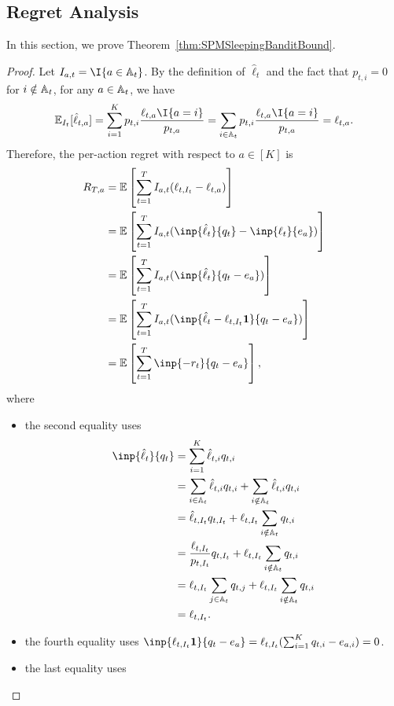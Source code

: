 \subsection{Regret Analysis}
In this section, we prove Theorem~\ref{thm:SPMSleepingBanditBound}.
\begin{proof}
Let $I_{a,t} = \I{a \in \sA_t}$. By the definition of $\hat{\ell}_t$ and the fact that $p_{t,i} = 0$ for $i \notin {\mathbb{A}}_t$, for any $a \in {\mathbb{A}}_t$, we have 
\begin{align}
    \E_{I_t}[\hat{\ell}_{t,a}] = \sum_{i=1}^K p_{t,i}\frac{\ell_{t,a}\I{a = i}}{p_{t,a}} = \sum_{i \in \sA_t}p_{t,i} \frac{\ell_{t,a}\I{a = i}}{p_{t,a}} = \ell_{t,a}.
\end{align}
Therefore, the per-action regret with respect to $a \in [K]$ is
\begin{align*}
    R_{T,a} &= \E\left[\sum_{t=1}^T I_{a,t}(\ell_{t,I_t} - \ell_{t,a})\right] \\
    &= \E\left[ \sum_{t=1}^T I_{a,t}(\inp{\hat{\ell}_t}{q_t} - \inp{\ell_t}{e_a}) \right] \\
    &= \E\left[ \sum_{t=1}^T I_{a,t}(\inp{\hat{\ell}_t}{q_t-e_a}) \right] \\
    &= \E\left[ \sum_{t=1}^T I_{a,t}(\inp{\hat{\ell}_t - \ell_{t,I_t}\1}{q_t-e_a}) \right] \\
    &= \E\left[ \sum_{t=1}^T \inp{-r_t}{q_t-e_a} \right],
\end{align*}
where 
\begin{itemize}
    \item the second equality uses
    \begin{align*}
        \inp{\hat{\ell}_t}{q_t} &= \sum_{i=1}^K \hat{\ell}_{t,i}q_{t,i} \\
        &= \sum_{i \in \sA_t} \hat{\ell}_{t,i}q_{t,i} + \sum_{i \notin \sA_t} \hat{\ell}_{t,i}q_{t,i} \\
        &= \hat{\ell}_{t,I_t}q_{t,I_t} + \ell_{t,I_t}\sum_{i \notin \sA_t}q_{t,i} \\
        &= \frac{{\ell}_{t,I_t}}{p_{t,I_t}}q_{t,I_t} + \ell_{t,I_t}\sum_{i \notin \sA_t}q_{t,i} \\
        &= \ell_{t,I_t}\sum_{j \in \sA_t}q_{t,j} + \ell_{t,I_t}\sum_{i \notin \sA_t}q_{t,i} \\
        &= \ell_{t,I_t}.
    \end{align*}
    \item the fourth equality uses $\inp{\ell_{t,I_t}\1}{q_t - e_a} = \ell_{t,I_t}(\sum_{i=1}^K q_{t,i} - e_{a,i}) = 0$.
    \item the last equality uses 

\end{itemize}
\end{proof}

